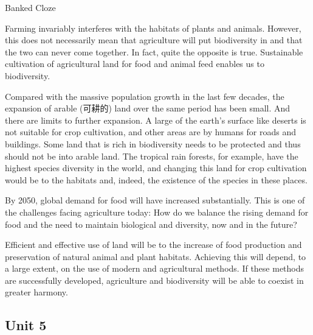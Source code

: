 \begin{question}{Banked Cloze}

Farming invariably interferes with the habitats of plants and animals. However, this does not necessarily mean that agriculture will put biodiversity in \textbf{\color{red}{jeopardy}} and that the two can never come together. In fact, quite the opposite is true. Sustainable cultivation of agricultural land for food and animal feed enables us to \textbf{\color{red}{conserve}} biodiversity.

Compared with the massive population growth in the last few decades, the expansion of arable (可耕的) land over the same period has been small. And there are limits to further expansion. A large \textbf{\color{red}{proportion}} of the earth's surface like deserts is not suitable for crop cultivation, and other areas are \textbf{\color{red}{utilized}} by humans for roads and buildings. Some land that is rich in biodiversity needs to be protected and thus should not be \textbf{\color{red}{converted}} into arable land. The tropical rain forests, for example, have the highest species diversity in the world, and changing this land for crop cultivation would be \textbf{\color{red}{devastating}} to the habitats and, indeed, the existence of the species in these places.

By 2050, global demand for food will have increased substantially. This is one of the \textbf{\color{red}{monumental}} challenges facing agriculture today: How do we balance the rising demand for food and the need to maintain biological \textbf{\color{red}{integrity}} and diversity, now and in the future?

Efficient and effective use of land will be \textbf{\color{red}{imperative}} to the increase of food production and preservation of natural animal and plant habitats. Achieving this will depend, to a large extent, on the use of modern and \textbf{\color{red}{innovative}} agricultural methods. If these methods are successfully developed, agriculture and biodiversity will be able to coexist in greater harmony.

\end{question}

\newpage

\subsection{Unit 5}

